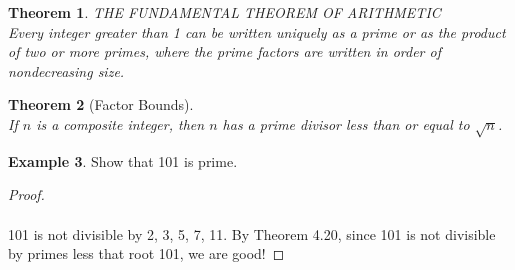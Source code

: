 \documentclass[letterpaper,10pt]{article}
\theoremstyle{plain}
\newtheorem{thm}{Theorem}[section]
\theoremstyle{definition}
\newtheorem{exmp}[thm]{Example}
\theoremstyle{remark}
\begin{document}
\begin{thm}{THE FUNDAMENTAL THEOREM OF ARITHMETIC}$ $\\
Every integer greater than 1 can be written uniquely as a prime or as the product of two or more primes, where the prime factors are written in order of nondecreasing size.
\end{thm}
\begin{thm}[Factor Bounds]$ $\\
If $n$ is a composite integer, then $n$ has a prime divisor less than or equal to $\sqrt{n}$.

\end{thm}
\begin{exmp}Show that 101 is prime.
\begin{proof} $ $\\
\vspace{2cm}
 $ $\\
 101 is not divisible by 2, 3, 5, 7, 11. By Theorem 4.20, since 101 is not divisible by primes less that root 101, we are good!
\end{proof}
\end{exmp}
\end{document}
